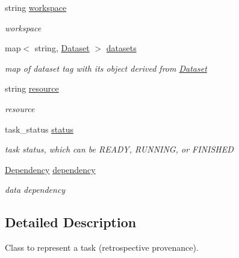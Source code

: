 \begin{DoxyCompactItemize}
string \hyperlink{classTask_a9827ffbb7019894dffd2c27350613634}{workspace}
\begin{DoxyCompactList}\small\item\em workspace \end{DoxyCompactList}\item 
\mbox{\label{classTask_a531bf480558a3ee2d9554fc0d91bafd3}} 
map$<$ string, \hyperlink{classDataset}{Dataset} $>$ \hyperlink{classTask_a531bf480558a3ee2d9554fc0d91bafd3}{datasets}
\begin{DoxyCompactList}\small\item\em map of dataset tag with its object derived from \hyperlink{classDataset}{Dataset} \end{DoxyCompactList}\item 
\mbox{\label{classTask_af5b241fe56a17e15d824ac7b57501f72}} 
string \hyperlink{classTask_af5b241fe56a17e15d824ac7b57501f72}{resource}
\begin{DoxyCompactList}\small\item\em resource \end{DoxyCompactList}\item 
\mbox{\label{classTask_ae814b4785e245eb50a6b5a745408a271}} 
task\+\_\+status \hyperlink{classTask_ae814b4785e245eb50a6b5a745408a271}{status}
\begin{DoxyCompactList}\small\item\em task status, which can be R\+E\+A\+DY, R\+U\+N\+N\+I\+NG, or F\+I\+N\+I\+S\+H\+ED \end{DoxyCompactList}\item 
\mbox{\label{classTask_a3646beab5c494e230601630dc5ffe27d}} 
\hyperlink{classDependency}{Dependency} \hyperlink{classTask_a3646beab5c494e230601630dc5ffe27d}{dependency}
\begin{DoxyCompactList}\small\item\em data dependency \end{DoxyCompactList}\end{DoxyCompactItemize}


\subsection{Detailed Description}
Class to represent a task (retrospective provenance). 

